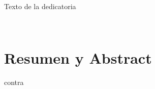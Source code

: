 \documentclass[11pt, twoside]{book}  %
\author{Faccion de Osadia}
\begin{document}
\frontmatter

\portada

\begin{dedicatoria}
    Texto de la dedicatoria
\end{dedicatoria}




\


\chapter*{Resumen y Abstract}




\mainmatter
\marcagua









\appendix


%

\clearpage
\backmatter
 {contra}
\end{document}

